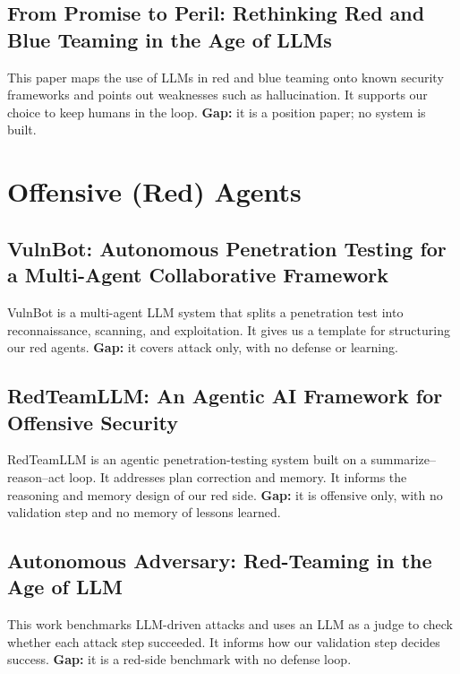 \subsection{From Promise to Peril: Rethinking Red and Blue Teaming in the Age of LLMs}
This paper maps the use of LLMs in red and blue teaming onto known security
frameworks and points out weaknesses such as hallucination. It supports our
choice to keep humans in the loop. \textbf{Gap:} it is a position paper; no
system is built.

\section{Offensive (Red) Agents}

\subsection{VulnBot: Autonomous Penetration Testing for a Multi-Agent Collaborative Framework}
VulnBot is a multi-agent LLM system that splits a penetration test into
reconnaissance, scanning, and exploitation. It gives us a template for
structuring our red agents. \textbf{Gap:} it covers attack only, with no defense
or learning.

\subsection{RedTeamLLM: An Agentic AI Framework for Offensive Security}
RedTeamLLM is an agentic penetration-testing system built on a
summarize--reason--act loop. It addresses plan correction and memory. It informs
the reasoning and memory design of our red side. \textbf{Gap:} it is offensive
only, with no validation step and no memory of lessons learned.

\subsection{Autonomous Adversary: Red-Teaming in the Age of LLM}
This work benchmarks LLM-driven attacks and uses an LLM as a judge to check
whether each attack step succeeded. It informs how our validation step decides
success. \textbf{Gap:} it is a red-side benchmark with no defense loop.

